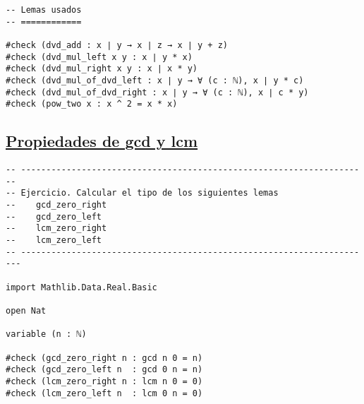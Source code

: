 \begin{verbatim}
-- Lemas usados
-- ============

#check (dvd_add : x ∣ y → x ∣ z → x ∣ y + z)
#check (dvd_mul_left x y : x ∣ y * x)
#check (dvd_mul_right x y : x ∣ x * y)
#check (dvd_mul_of_dvd_left : x ∣ y → ∀ (c : ℕ), x ∣ y * c)
#check (dvd_mul_of_dvd_right : x ∣ y → ∀ (c : ℕ), x ∣ c * y)
#check (pow_two x : x ^ 2 = x * x)
\end{verbatim}

\subsection{\href{./src/Basicos/Propiedades\_de\_gcd\_y\_lcm.lean}{Propiedades de gcd y lcm}}
\label{sec:orge427058}
\begin{verbatim}
-- ---------------------------------------------------------------------
-- Ejercicio. Calcular el tipo de los siguientes lemas
--    gcd_zero_right
--    gcd_zero_left
--    lcm_zero_right
--    lcm_zero_left
-- ----------------------------------------------------------------------

import Mathlib.Data.Real.Basic

open Nat

variable (n : ℕ)

#check (gcd_zero_right n : gcd n 0 = n)
#check (gcd_zero_left n  : gcd 0 n = n)
#check (lcm_zero_right n : lcm n 0 = 0)
#check (lcm_zero_left n  : lcm 0 n = 0)
\end{verbatim}

